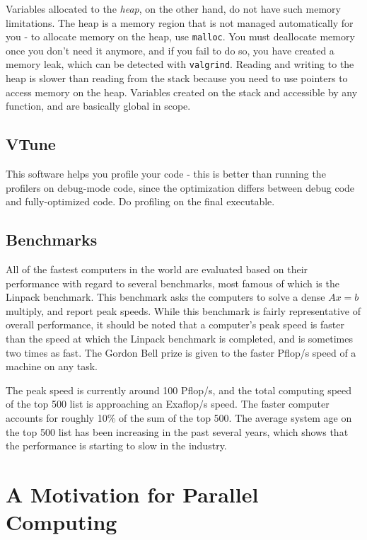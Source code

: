 \documentclass[10pt]{article}
\begin{document}
\begin{flushleft}
Variables allocated to the \textit{heap}, on the other hand, do not have such memory limitations. The heap is a memory region that is not managed automatically for you - to allocate memory on the heap, use {\tt malloc}. You must deallocate memory once you don't need it anymore, and if you fail to do so, you have created a memory leak, which can be detected with {\tt valgrind}. Reading and writing to the heap is slower than reading from the stack because you need to use pointers to access memory on the heap. Variables created on the stack and accessible by any function, and are basically global in scope.

\subsection{VTune}

This software helps you profile your code - this is better than running the profilers on debug-mode code, since the optimization differs between debug code and fully-optimized code. Do profiling on the final executable.

\subsection{Benchmarks}

All of the fastest computers in the world are evaluated based on their performance with regard to several benchmarks, most famous of which is the Linpack benchmark. This benchmark asks the computers to solve a dense \(Ax=b\) multiply, and report peak speeds. While this benchmark is fairly representative of overall performance, it should be noted that a computer's peak speed is faster than the speed at which the Linpack benchmark is completed, and is sometimes two times as fast. The Gordon Bell prize is given to the faster Pflop/s speed of a machine on any task.

The peak speed is currently around 100 Pflop/s, and the total computing speed of the top 500 list is approaching an Exaflop/s speed. The faster computer accounts for roughly 10\% of the sum of the top 500. The average system age on the top 500 list has been increasing in the past several years, which shows that the performance is starting to slow in the industry.

\section{A Motivation for Parallel Computing}


\end{flushleft}
\end{document}
